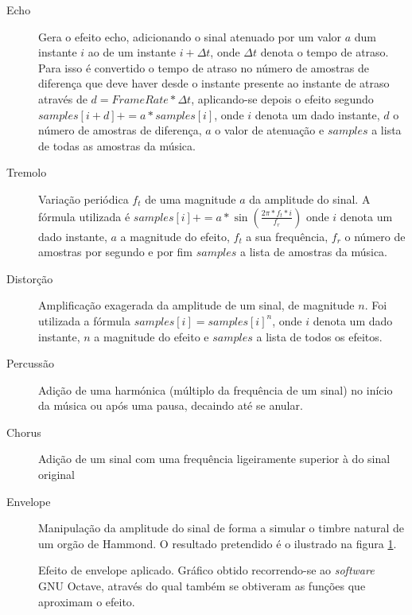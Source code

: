 \documentclass[a4paper,11pt,openright,oneside]{report}
\begin{document}
\begin{description}
\item[Echo] Gera o efeito echo, adicionando o sinal atenuado por um valor $a$ dum instante $i$ ao de um instante $i + \Delta t$, onde $\Delta t$ denota o tempo de atraso. Para isso é convertido o tempo de atraso no número de amostras de diferença que deve haver desde o instante presente ao instante de atraso através de $d = FrameRate * \Delta t$, aplicando-se depois o efeito segundo $samples[i + d] += a * samples[i]$, onde $i$ denota um dado instante, $d$ o número de amostras de diferença, $a$ o valor de atenuação e $samples$ a lista de todas as amostras da música.
\item[Tremolo] Variação periódica $f_t$ de uma magnitude $a$ da amplitude do sinal. A fórmula utilizada é $samples[i] += a * \sin(\frac{2\pi * f_t * i}{f_r})$ onde $i$ denota um dado instante, $a$ a magnitude do efeito, $f_t$ a sua frequência, $f_r$ o número de amostras por segundo e por fim $samples$ a lista de amostras da música.
\item[Distorção] Amplificação exagerada da amplitude de um sinal, de magnitude $n$. Foi utilizada a fórmula $samples[i] = samples[i]^n$, onde $i$ denota um dado instante, $n$ a magnitude do efeito e $samples$ a lista de todos os efeitos. 
\item[Percussão] Adição de uma harmónica (múltiplo da frequência de um sinal) no início da música ou após uma pausa, decaindo até se anular.
\item[Chorus] Adição de um sinal com uma frequência ligeiramente superior à do sinal original
\item[Envelope] Manipulação da amplitude do sinal de forma a simular o timbre natural de um orgão de Hammond. O resultado pretendido é o ilustrado na figura \ref{fig:sr2}.
\end{description}

\begin{figure}[ht]	
\center
{}
\caption{Efeito de envelope aplicado. Gráfico obtido recorrendo-se ao \textit{software} GNU Octave, através do qual também se obtiveram as funções que aproximam o efeito.}
\label{fig:sr2}
\end{figure}
\end{document}
